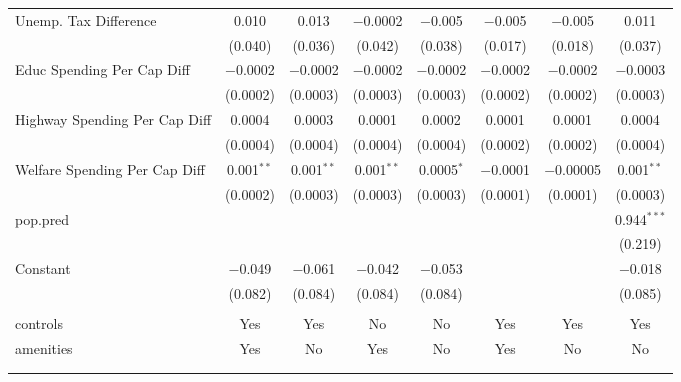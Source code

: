\begin{table}[!htbp]
\begin{tabular}{@{\extracolsep{5pt}}lccccccc}
  Unemp. Tax Difference & 0.010 & 0.013 & $-$0.0002 & $-$0.005 & $-$0.005 & $-$0.005 & 0.011 \\ 
  & (0.040) & (0.036) & (0.042) & (0.038) & (0.017) & (0.018) & (0.037) \\ 
  Educ Spending Per Cap Diff & $-$0.0002 & $-$0.0002 & $-$0.0002 & $-$0.0002 & $-$0.0002 & $-$0.0002 & $-$0.0003 \\ 
  & (0.0002) & (0.0003) & (0.0003) & (0.0003) & (0.0002) & (0.0002) & (0.0003) \\ 
  Highway Spending Per Cap Diff & 0.0004 & 0.0003 & 0.0001 & 0.0002 & 0.0001 & 0.0001 & 0.0004 \\ 
  & (0.0004) & (0.0004) & (0.0004) & (0.0004) & (0.0002) & (0.0002) & (0.0004) \\ 
  Welfare Spending Per Cap Diff & 0.001$^{**}$ & 0.001$^{**}$ & 0.001$^{**}$ & 0.0005$^{*}$ & $-$0.0001 & $-$0.00005 & 0.001$^{**}$ \\ 
  & (0.0002) & (0.0003) & (0.0003) & (0.0003) & (0.0001) & (0.0001) & (0.0003) \\ 
  pop.pred &  &  &  &  &  &  & 0.944$^{***}$ \\ 
  &  &  &  &  &  &  & (0.219) \\ 
  Constant & $-$0.049 & $-$0.061 & $-$0.042 & $-$0.053 &  &  & $-$0.018 \\ 
  & (0.082) & (0.084) & (0.084) & (0.084) &  &  & (0.085) \\ 
 \hline \\[-1.8ex] 
controls & Yes & Yes & No & No & Yes & Yes & Yes \\ 
amenities & Yes & No & Yes & No & Yes & No & No \\ 
\hline \\[-1.8ex] 
\hline 
\hline \\[-1.8ex] 
\end{tabular} 
\end{table} 
